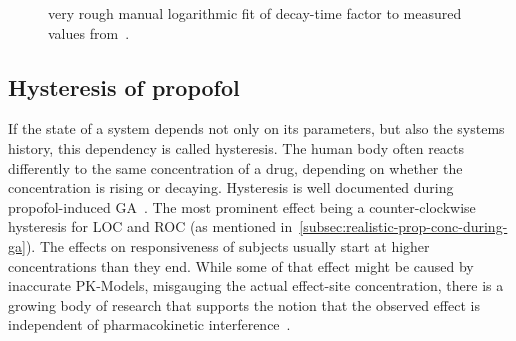 \begin{figure}[H]
    \centering
    \pgfplotsset{compat = newest}

    \caption{very rough manual logarithmic fit of decay-time factor to measured values
    from~\cite{kitamura_effects_2003}.}
    \label{fig:lambda_fit}
\end{figure}

\subsection{Hysteresis of propofol}
If the state of a system depends not only on its parameters, but also the systems history,
this dependency is called hysteresis.
The human body often reacts differently to the same concentration of a drug,
depending on whether the concentration is rising or decaying.
Hysteresis is well documented during propofol-induced GA~\cite{kuizenga_quantitative_1998,
    iwakiri_individual_2005,
    sepulveda_evidence_2018,ferreira_patterns_2020, su_hysteresis_2020}.
The most prominent effect being a counter-clockwise hysteresis for LOC and ROC (as mentioned
in~\ref{subsec:realistic-prop-conc-during-ga}).
The effects on responsiveness of subjects usually start at higher concentrations than they end.
While some of that effect might be caused by inaccurate PK-Models,
misgauging the actual effect-site concentration,
there is a growing body of research that supports the notion that the observed effect is independent of
pharmacokinetic interference~\cite{hutt_progress_2011, su_hysteresis_2020}.

